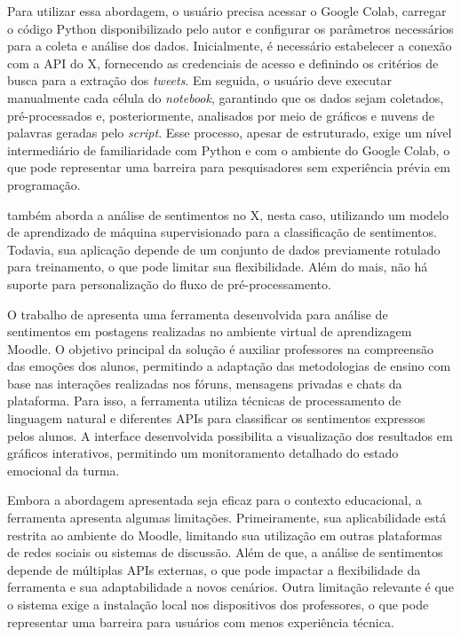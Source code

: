 \documentclass[
	12pt,				%
	oneside,			%
	a4paper,			%
	english,			%
	french,				%
	spanish,			%
	brazil				%
	]{abntex2}
\begin{document}
Para utilizar essa abordagem, o usuário precisa acessar o Google Colab,
carregar o código Python disponibilizado pelo autor e configurar os
parâmetros necessários para a coleta e análise dos dados. Inicialmente,
é necessário estabelecer a conexão com a API do X, fornecendo as
credenciais de acesso e definindo os critérios de busca para a extração
dos \emph{tweets}. Em seguida, o usuário deve executar manualmente cada
célula do \emph{notebook}, garantindo que os dados sejam coletados,
pré-processados e, posteriormente, analisados por meio de gráficos e
nuvens de palavras geradas pelo \emph{script}. Esse processo, apesar de
estruturado, exige um nível intermediário de familiaridade com Python e
com o ambiente do Google Colab, o que pode representar uma barreira para
pesquisadores sem experiência prévia em programação.

 também aborda a análise de
sentimentos no X, nesta caso, utilizando um modelo de aprendizado de
máquina supervisionado para a classificação de sentimentos. Todavia, sua
aplicação depende de um conjunto de dados previamente rotulado para
treinamento, o que pode limitar sua flexibilidade. Além do mais, não há
suporte para personalização do fluxo de pré-processamento.

O trabalho de  apresenta uma ferramenta
desenvolvida para análise de sentimentos em postagens realizadas no
ambiente virtual de aprendizagem Moodle. O objetivo principal da solução
é auxiliar professores na compreensão das emoções dos alunos, permitindo
a adaptação das metodologias de ensino com base nas interações
realizadas nos fóruns, mensagens privadas e chats da plataforma. Para
isso, a ferramenta utiliza técnicas de processamento de linguagem
natural e diferentes APIs para classificar os sentimentos expressos
pelos alunos. A interface desenvolvida possibilita a visualização dos
resultados em gráficos interativos, permitindo um monitoramento
detalhado do estado emocional da turma.

Embora a abordagem apresentada seja eficaz para o contexto educacional,
a ferramenta apresenta algumas limitações. Primeiramente, sua
aplicabilidade está restrita ao ambiente do Moodle, limitando sua
utilização em outras plataformas de redes sociais ou sistemas de
discussão. Além de que, a análise de sentimentos depende de múltiplas
APIs externas, o que pode impactar a flexibilidade da ferramenta e sua
adaptabilidade a novos cenários. Outra limitação relevante é que o
sistema exige a instalação local nos dispositivos dos professores, o que
pode representar uma barreira para usuários com menos experiência
técnica.
\end{document}
